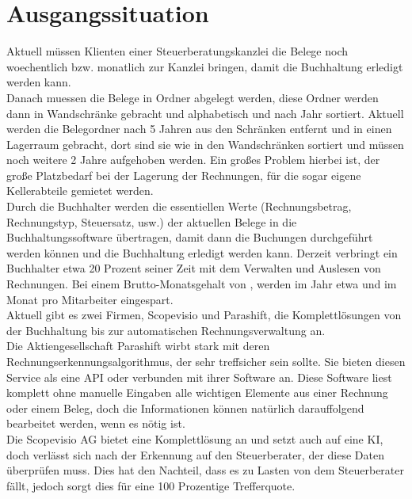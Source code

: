 \documentclass[12pt]{article}
\theoremstyle{definition}
\begin{document}
\section{Ausgangssituation}
Aktuell müssen Klienten einer Steuerberatungskanzlei die Belege noch woechentlich bzw. monatlich zur Kanzlei bringen, damit die Buchhaltung erledigt werden kann.\\
	
Danach muessen die Belege in Ordner abgelegt werden, diese Ordner werden dann in Wandschränke gebracht und alphabetisch und nach Jahr sortiert. Aktuell werden die Belegordner nach 5 Jahren aus den Schränken entfernt und in einen Lagerraum gebracht, dort sind sie wie in den Wandschränken sortiert und müssen noch weitere 2 Jahre aufgehoben werden. Ein großes Problem hierbei ist, der große Platzbedarf bei der Lagerung der Rechnungen, für die sogar eigene Kellerabteile gemietet werden.\\
	
Durch die Buchhalter werden die essentiellen Werte (Rechnungsbetrag, Rechnungstyp, Steuersatz, usw.) der aktuellen Belege in die Buchhaltungssoftware übertragen, damit dann die Buchungen durchgeführt werden können und die Buchhaltung erledigt werden kann.
Derzeit verbringt ein Buchhalter etwa 20 Prozent seiner Zeit mit dem Verwalten und Auslesen von Rechnungen. Bei einem Brutto-Monatsgehalt von , werden im Jahr etwa  und im Monat  pro Mitarbeiter eingespart.\\
	
Aktuell gibt es zwei Firmen, Scopevisio und Parashift, die Komplettlösungen von der Buchhaltung bis zur automatischen Rechnungsverwaltung an.\\

Die Aktiengesellschaft Parashift wirbt stark mit deren Rechnungserkennungsalgorithmus, der sehr treffsicher sein sollte. Sie bieten diesen Service als eine API oder verbunden mit ihrer Software an. Diese Software liest komplett ohne manuelle Eingaben alle wichtigen Elemente aus einer Rechnung oder einem Beleg, doch die Informationen können natürlich darauffolgend bearbeitet werden, wenn es nötig ist.\\
	
Die Scopevisio AG bietet eine Komplettlösung an und setzt auch auf eine KI, doch verlässt sich nach der Erkennung auf den Steuerberater, der diese Daten überprüfen muss. Dies hat den Nachteil, dass es zu Lasten von dem Steuerberater fällt, jedoch sorgt dies für eine 100 Prozentige Trefferquote.\\
	
\end{document}
